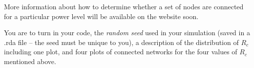 \documentclass[12pt]{article}
\begin{document}
More information about how to determine whether a set of nodes
are connected for a particular power level will be available 
on the website soon.

You are to turn in your code, the \textit{random seed} used in your 
simulation (saved in a .rda file -- the seed must be unique to you), 
a description of the distribution of $R_c$ including one plot, 
and four plots of connected networks for the four values of $R_c$ 
mentioned above.

\begin{comment}
\begin{figure}
\epsfig{file= contourRiver.pdf, width=6.5in} 
\caption{Contour plot of the region of interest. The contours are proportional
to the density of nodes.}
\label{contourPlot}
\end{figure}

\begin{figure}
\epsfig{file=perspRiver, width=6.5in}
\caption{A three-dimensional perspective plot of the region of interest. 
Note that the river curves through the center of the region and no nodes
are located near the river.}
\label{perspPlot}
\end{figure}
\end{comment}
\end{document}
